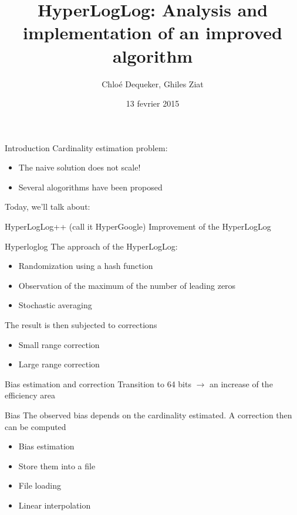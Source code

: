 \documentclass{beamer}
\title{HyperLogLog: Analysis and implementation of an improved algorithm}
\author{Chloé Dequeker, Ghiles Ziat}
\date{13 fevrier 2015}
\begin{document}
\maketitle

\begin{frame}{Introduction}
 Cardinality estimation problem:
  \begin{itemize}
    \item The naive solution does not scale!
    \item Several alogorithms have been proposed
  \end{itemize}

  \bigskip
  Today, we'll talk about:
  \begin{block}{HyperLogLog++ (call it HyperGoogle)}
    Improvement of the HyperLogLog
  \end{block}

\end{frame}

\begin{frame}{Hyperloglog}
  The approach of the HyperLogLog:
  \begin{itemize}
    \item Randomization using a hash function
    \item Observation of the maximum of the number of leading zeros
    \item Stochastic averaging
  \end{itemize}
  \bigskip
  The result is then subjected to corrections
  \begin{itemize}
    \item Small range correction 
    \item Large range correction
  \end{itemize}
\end{frame}

\begin{frame}{Bias estimation and correction}
  Transition to 64 bits $ \rightarrow $ an increase of the efficiency area
   
  \bigskip

  \begin{block}{Bias}
    The observed bias depends on the cardinality estimated.
    A correction then can be computed 
  \end{block} 
  
  \begin{itemize}
    \item Bias estimation
    \item Store them into a file
    \item File loading
    \item Linear interpolation
  \end{itemize}
\end{frame}
\end{document}
